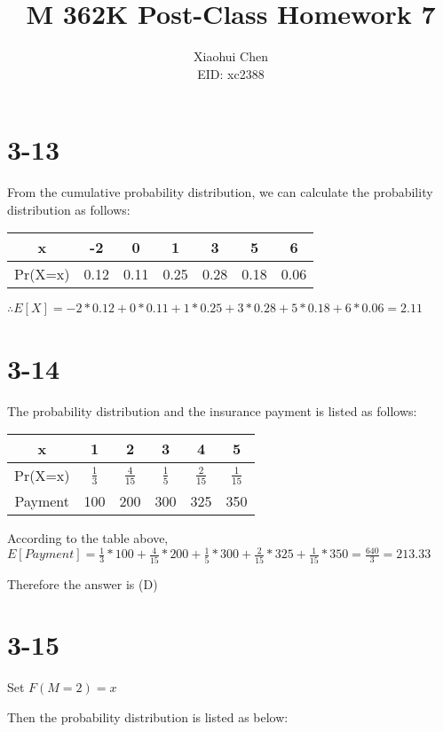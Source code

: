 \documentclass[12pt]{article}
\author{Xiaohui Chen \\EID: xc2388}
\title{M 362K Post-Class Homework 7}
\begin{document}
\maketitle
\begin{spacing}{2.0}

\section*{3-13}
From the cumulative probability distribution, we can calculate the probability distribution as follows:

\begin{tabular}{|c|c|c|c|c|c|c|}
  \hline
  x & -2 & 0 & 1 & 3 & 5 & 6 \\
  \hline
  Pr(X=x) & 0.12 & 0.11 & 0.25 & 0.28 & 0.18 & 0.06 \\
  \hline
\end{tabular}

$\therefore E[X]=-2*0.12+0*0.11+1*0.25+3*0.28+5*0.18+ 6*0.06=2.11$

\section*{3-14}
The probability distribution and the insurance payment is listed as follows:

\begin{tabular}{|c|c|c|c|c|c|}
  \hline
  x & 1 & 2 & 3 & 4 & 5 \\
  \hline
  Pr(X=x) & $\frac{1}{3}$ & $\frac{4}{15}$ & $\frac{1}{5}$ & $\frac{2}{15}$ & $\frac{1}{15}$ \\
  \hline
  Payment & 100 & 200 & 300 & 325 & 350 \\
  \hline
\end{tabular}

According to the table above, $E[Payment]=\frac{1}{3}*100 + \frac{4}{15}*200 + \frac{1}{5}*300+ \frac{2}{15}*325 + \frac{1}{15}*350= \frac{640}{3}=213.33$

Therefore the answer is (D)

\section*{3-15}

Set $F(M=2)= x$

Then the probability distribution is listed as below:


\end{spacing}
\end{document}
